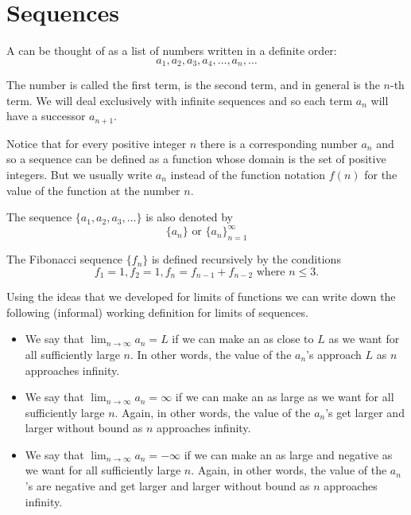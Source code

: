 \section{Sequences}
\begin{definition}
A  can be thought of as a list of numbers written in a definite order:
\[ a_1, a_2, a_3, a_4, \dots, a_n, \dots \]
\end{definition}

The number is called the first term, is the second term, and in general is the $n$-th term. We will deal exclusively with infinite sequences and so each term $a_n$ will have a successor $a_{n+1}$.

Notice that for every positive integer $n$ there is a corresponding number $a_n$ and so a sequence can be defined as a function whose domain is the set of positive integers. But we usually write $a_n$ instead of the function notation $f(n)$ for the value of the function at the number $n$.

\begin{notation}
The sequence $\{a_1,a_2,a_3,\dots\}$ is also denoted by
\[ \{a_n\} \text{ or } \{a_n\}_{n=1}^\infty \]
\end{notation}

\begin{example}
The Fibonacci sequence $\{f_n\}$ is defined recursively by the conditions
\[ f_1=1, f_2=1, f_n=f_{n-1}+f_{n-2} \text{ where } n\le3. \]
\end{example}

Using the ideas that we developed for limits of functions we can write down the following (informal) working definition for limits of sequences.
\begin{itemize}
\item We say that $\lim_{n\to\infty}a_n=L$ if we can make an as close to $L$ as we want for all sufficiently large $n$. In other words, the value of the $a_n$'s approach $L$ as $n$ approaches infinity.
\item We say that $\lim_{n\to\infty}a_n=\infty$ if we can make an as large as we want for all sufficiently large $n$. Again, in other words, the value of the $a_n$'s get larger and larger without bound as $n$ approaches infinity.
\item We say that $\lim_{n\to\infty}a_n=-\infty$ if we can make an as large and negative as we want for all sufficiently large $n$. Again, in other words, the value of the $a_n$'s are negative and get larger and larger without bound as $n$ approaches infinity.
\end{itemize}

